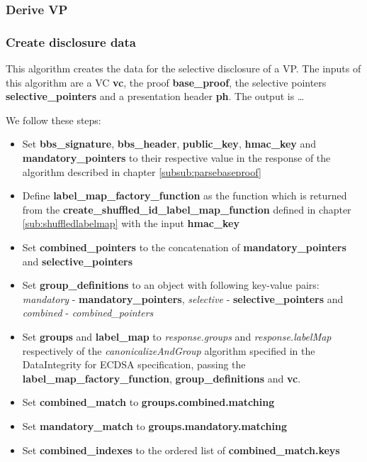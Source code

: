 \documentclass[
	a4paper               %
	,bibliography=totoc   %
	,listof=totoc         %
	,monolingual
	twoside=false,
]{bfhthesis}              %
\begin{document}
\subsubsection{Derive VP}
\label{subsub:derivevp}


\subsubsection{Create disclosure data}
\label{subsub:createdisclosuredata}

This algorithm creates the data for the selective disclosure of a VP.
The inputs of this algorithm are a VC \textbf{vc}, the proof \textbf{base\_proof}, the selective pointers \textbf{selective\_pointers} and a presentation header \textbf{ph}.
The output is \dots

We follow these steps:
\begin{itemize}
	\item Set \textbf{bbs\_signature}, \textbf{bbs\_header}, \textbf{public\_key}, \textbf{hmac\_key} and \textbf{mandatory\_pointers} to their respective value in the response of the algorithm described in chapter \ref{subsub:parsebaseproof}
	\item Define \textbf{label\_map\_factory\_function} as the function which is returned from the \textbf{create\_shuffled\_id\_label\_map\_function} defined in chapter \ref{sub:shuffledlabelmap} with the input \textbf{hmac\_key}
	\item Set \textbf{combined\_pointers} to the concatenation of \textbf{mandatory\_pointers} and \textbf{selective\_pointers}
	\item Set \textbf{group\_definitions} to an object with following key-value pairs: \textit{mandatory} - \textbf{mandatory\_pointers}, \textit{selective} - \textbf{selective\_pointers} and \textit{combined} - \textit{combined\_pointers}
	\item Set \textbf{groups} and \textbf{label\_map} to \textit{response.groups} and \textit{response.labelMap} respectively of the \textit{canonicalizeAndGroup} algorithm specified in the DataIntegrity for ECDSA specification\cite{ecdsa}, passing the \textbf{label\_map\_factory\_function}, \textbf{group\_definitions} and \textbf{vc}.
	\item Set \textbf{combined\_match} to \textbf{groups.combined.matching}
	\item Set \textbf{mandatory\_match} to \textbf{groups.mandatory.matching}
	\item Set \textbf{combined\_indexes} to the ordered list of \textbf{combined\_match.keys}

\end{itemize}
\end{document}
